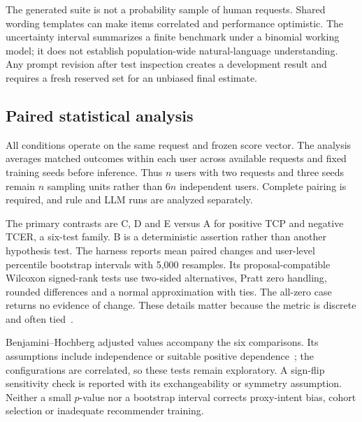 \documentclass[conference]{IEEEtran}
\begin{document}
The generated suite is not a probability sample of human requests. Shared wording templates can make items correlated and performance optimistic. The uncertainty interval summarizes a finite benchmark under a binomial working model; it does not establish population-wide natural-language understanding. Any prompt revision after test inspection creates a development result and requires a fresh reserved set for an unbiased final estimate.

\subsection{Paired statistical analysis}
All conditions operate on the same request and frozen score vector. The analysis averages matched outcomes within each user across available requests and fixed training seeds before inference. Thus $n$ users with two requests and three seeds remain $n$ sampling units rather than $6n$ independent users. Complete pairing is required, and rule and LLM runs are analyzed separately.

The primary contrasts are C, D and E versus A for positive TCP and negative TCER, a six-test family. B is a deterministic assertion rather than another hypothesis test. The harness reports mean paired changes and user-level percentile bootstrap intervals with 5,000 resamples. Its proposal-compatible Wilcoxon signed-rank tests use two-sided alternatives, Pratt zero handling, rounded differences and a normal approximation with ties. The all-zero case returns no evidence of change. These details matter because the metric is discrete and often tied~\cite{scipywilcoxon}.

Benjamini--Hochberg adjusted values accompany the six comparisons. Its assumptions include independence or suitable positive dependence~\cite{scipyfdr}; the configurations are correlated, so these tests remain exploratory. A sign-flip sensitivity check is reported with its exchangeability or symmetry assumption. Neither a small $p$-value nor a bootstrap interval corrects proxy-intent bias, cohort selection or inadequate recommender training.
\end{document}
